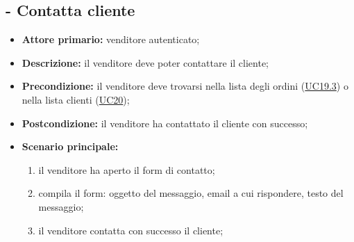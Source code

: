 \stepUserCase
\subsection{ - Contatta cliente}
\begin{itemize}
    \item \textbf{Attore primario:} venditore autenticato;
    \item \textbf{Descrizione:} il venditore deve poter contattare il cliente;
    \item \textbf{Precondizione:} il venditore deve trovarsi nella lista degli ordini (\hyperref[UC19.3]{UC19.3}) o nella lista clienti (\hyperref[UC20]{UC20});
    \item \textbf{Postcondizione:} il venditore ha contattato il cliente con successo;
    \item \textbf{Scenario principale:}
          \begin{enumerate}
              \item il venditore ha aperto il form di contatto;
              \item compila il form: oggetto del messaggio, email a cui rispondere, testo del messaggio;
              \item il venditore contatta con successo il cliente;
          \end{enumerate}
\end{itemize}

\stepUserCase

